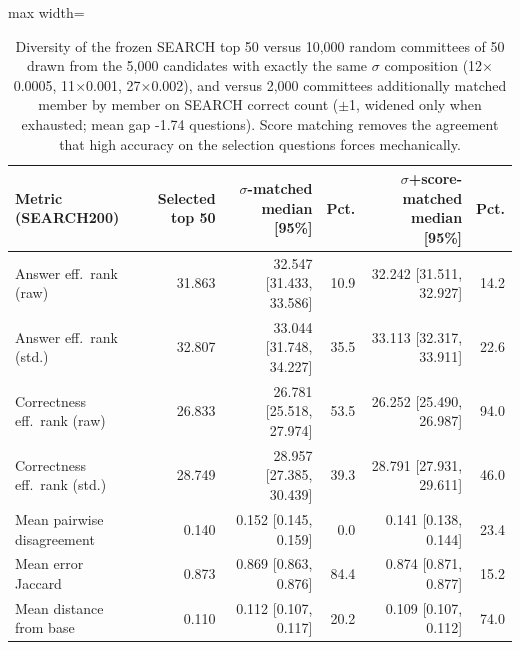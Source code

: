 \begin{table}[t]
\centering
\small
\begin{adjustbox}{max width=\linewidth}
\begin{tabular}{lrrrrr}
\toprule
Metric (SEARCH200) & Selected top 50 & $\sigma$-matched median [95\%] & Pct. & $\sigma$+score-matched median [95\%] & Pct. \\
\midrule
Answer eff.\ rank (raw) & 31.863 & 32.547 [31.433, 33.586] & 10.9 & 32.242 [31.511, 32.927] & 14.2 \\
Answer eff.\ rank (std.) & 32.807 & 33.044 [31.748, 34.227] & 35.5 & 33.113 [32.317, 33.911] & 22.6 \\
Correctness eff.\ rank (raw) & 26.833 & 26.781 [25.518, 27.974] & 53.5 & 26.252 [25.490, 26.987] & 94.0 \\
Correctness eff.\ rank (std.) & 28.749 & 28.957 [27.385, 30.439] & 39.3 & 28.791 [27.931, 29.611] & 46.0 \\
Mean pairwise disagreement & 0.140 & 0.152 [0.145, 0.159] & 0.0 & 0.141 [0.138, 0.144] & 23.4 \\
Mean error Jaccard & 0.873 & 0.869 [0.863, 0.876] & 84.4 & 0.874 [0.871, 0.877] & 15.2 \\
Mean distance from base & 0.110 & 0.112 [0.107, 0.117] & 20.2 & 0.109 [0.107, 0.112] & 74.0 \\
\bottomrule
\end{tabular}
\end{adjustbox}
\caption{Diversity of the frozen SEARCH top 50 versus 10,000 random committees of 50 drawn from the 5,000 candidates with exactly the same $\sigma$ composition (12$\times$0.0005, 11$\times$0.001, 27$\times$0.002), and versus 2,000 committees additionally matched member by member on SEARCH correct count ($\pm$1, widened only when exhausted; mean gap -1.74 questions). Score matching removes the agreement that high accuracy on the selection questions forces mechanically.}
\label{tab:selection-diversity}
\end{table}
